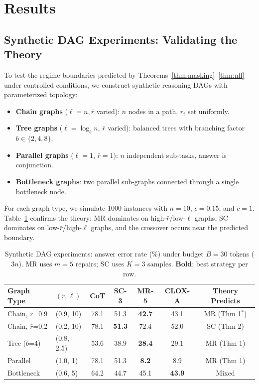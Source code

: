 \documentclass{article}
\begin{document}
\section{Results}
\label{sec:results}

\subsection{Synthetic DAG Experiments: Validating the Theory}

To test the regime boundaries predicted by Theorems~\ref{thm:masking}--\ref{thm:nfl} under controlled conditions, we construct synthetic reasoning DAGs with parameterized topology:

\begin{itemize}[nosep, leftmargin=*]
\item \textbf{Chain graphs} ($\ell = n, \bar{r}$ varied): $n$ nodes in a path, $r_i$ set uniformly.
\item \textbf{Tree graphs} ($\ell = \log_b n$, $\bar{r}$ varied): balanced trees with branching factor $b \in \{2, 4, 8\}$.
\item \textbf{Parallel graphs} ($\ell = 1$, $\bar{r} = 1$): $n$ independent sub-tasks, answer is conjunction.
\item \textbf{Bottleneck graphs}: two parallel sub-graphs connected through a single bottleneck node.
\end{itemize}

For each graph type, we simulate 1000 instances with $n=10$, $\epsilon = 0.15$, and $c = 1$. Table~\ref{tab:synthetic} confirms the theory: MR dominates on high-$\bar{r}$/low-$\ell$ graphs, SC dominates on low-$\bar{r}$/high-$\ell$ graphs, and the crossover occurs near the predicted boundary.

\begin{table}[t]
\centering
\caption{Synthetic DAG experiments: answer error rate (\%) under budget $B = 30$ tokens ($3n$). MR uses $m = 5$ repairs; SC uses $K = 3$ samples. \textbf{Bold}: best strategy per row.}
\label{tab:synthetic}
\small
\begin{tabular}{llccccc}
\toprule
\textbf{Graph Type} & $(\bar{r}, \ell)$ & \textbf{CoT} & \textbf{SC-3} & \textbf{MR-5} & \textbf{CLOX-A} & \textbf{Theory Predicts} \\
\midrule
Chain, $\bar{r}$=0.9 & (0.9, 10) & 78.1 & 51.3 & \textbf{42.7} & 43.1 & MR (Thm 1$^*$) \\
Chain, $\bar{r}$=0.2 & (0.2, 10) & 78.1 & \textbf{51.3} & 72.4 & 52.0 & SC (Thm 2) \\
Tree ($b$=4) & (0.8, 2.5) & 53.6 & 38.9 & \textbf{28.4} & 29.1 & MR (Thm 1) \\
Parallel & (1.0, 1) & 78.1 & 51.3 & \textbf{8.2} & 8.9 & MR (Thm 1) \\
Bottleneck & (0.6, 5) & 64.2 & 44.7 & 45.1 & \textbf{43.9} & Mixed \\
\bottomrule
\end{tabular}
\end{table}
\end{document}

